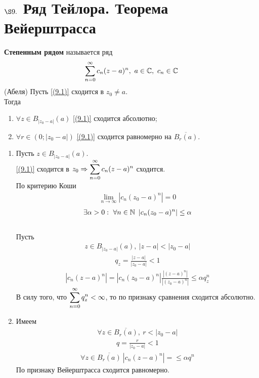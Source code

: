 \section{$\S 9.$ Ряд Тейлора. Теорема Вейерштрасса}
\Def
\textbf{Степенным рядом} называется ряд
\begin{equation} \label{(9.1)}
    \sum_{n=0}^{\infty}c_n(z-a)^n, \ a \in \mathbb{C}, \ c_n \in \mathbb{C}
\end{equation}
\theorem (Абеля)
Пусть \eqref{(9.1)} сходится в $z_0 \neq a$.
\\
Тогда
\begin{enumerate}
    \item $\forall z \in B_{\left| z_0 - a \right|}(a)$ \eqref{(9.1)}
    сходится абсолютно;
    \item $\forall r \in (0; \left| z_0-a \right|)$ \eqref{(9.1)} сходится
    равномерно на $\overline{B_r(a)}$.
\end{enumerate}
\pr
\begin{enumerate}
    \item Пусть $z \in B_{\left| z_0-a \right|}(a)$.
    \\
    \eqref{(9.1)} сходится в $z_0 \Rightarrow \displaystyle
    \sum_{n=0}^{\infty}c_n(z-a)^n$ сходится.
    \\
    По критерию Коши
    \begin{align*}
      \lim_{n \to \infty}\left| c_n(z_0-a)^n \right| = 0
    \end{align*}
    \begin{align*}
      \exists \alpha > 0: \ \forall n \in \mathbb{N} \ \left| c_n(z_0-a)^n \right| \leq \alpha
    \end{align*}
    \\
    Пусть
    \begin{align*}
      z \in B_{\left| z_0-a \right|}(a), \ \left| z-a \right|< \left| z_0-a \right|
    \end{align*}
    \begin{align*}
      q_z = \frac{\left| z-a \right|}{\left| z_0-a \right|} < 1
    \end{align*}
    \begin{align*}
      \left| c_n(z-a)^n \right| = \left| c_n(z_0-a)^n \right|\frac{\left| (z-a)^n \right|}{\left| (z_0-a)^n \right|} \leq \alpha q_z^n
    \end{align*}
    В силу того, что $\displaystyle \sum_{n=0}^{\infty}q_{z}^{n} < \infty$, то по
    признаку сравнения сходится абсолютно.
    \item Имеем
    \begin{align*}
      \forall z \in \overline{B_{r}(a)}, \ r < \left| z_0-a \right|
    \end{align*}
    \begin{align*}
      q = \frac{r}{\left| z_0-a \right|} < 1
    \end{align*}
    \begin{align*}
      \forall z \in \overline{B_r(a)} \ \left| c_n(z-a)^n \right| = \leq \alpha q^n
    \end{align*}
    По признаку Вейерштрасса сходится равномерно.
\end{enumerate}
